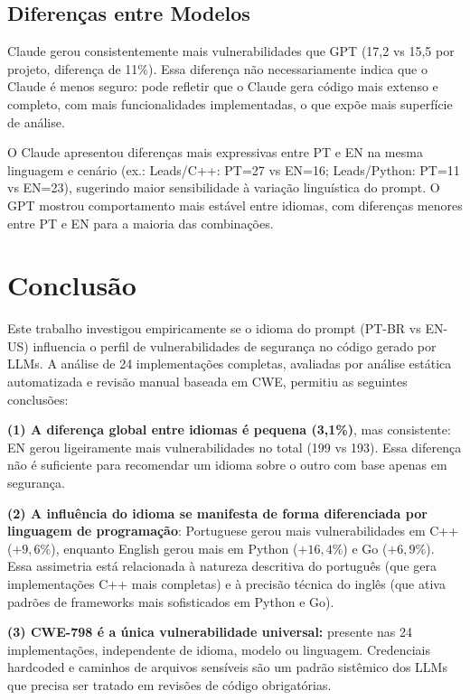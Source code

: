 \documentclass[12pt]{article}
\begin{document}
\subsection{Diferenças entre Modelos}

Claude gerou consistentemente mais vulnerabilidades que GPT (17,2 vs 15,5 por projeto, diferença de 11\%). Essa diferença não necessariamente indica que o Claude é menos seguro: pode refletir que o Claude gera código mais extenso e completo, com mais funcionalidades implementadas, o que expõe mais superfície de análise.

O Claude apresentou diferenças mais expressivas entre PT e EN na mesma linguagem e cenário (ex.: Leads/C++: PT=27 vs EN=16; Leads/Python: PT=11 vs EN=23), sugerindo maior sensibilidade à variação linguística do prompt. O GPT mostrou comportamento mais estável entre idiomas, com diferenças menores entre PT e EN para a maioria das combinações.

\section{Conclusão}
\label{sec:conclusao}

Este trabalho investigou empiricamente se o idioma do prompt (PT-BR vs EN-US) influencia o perfil de vulnerabilidades de segurança no código gerado por LLMs. A análise de 24 implementações completas, avaliadas por análise estática automatizada e revisão manual baseada em CWE, permitiu as seguintes conclusões:

\textbf{(1) A diferença global entre idiomas é pequena (3,1\%)}, mas consistente: EN gerou ligeiramente mais vulnerabilidades no total (199 vs 193). Essa diferença não é suficiente para recomendar um idioma sobre o outro com base apenas em segurança.

\textbf{(2) A influência do idioma se manifesta de forma diferenciada por linguagem de programação}: Portuguese gerou mais vulnerabilidades em C++ ($+9,6\%$), enquanto English gerou mais em Python ($+16,4\%$) e Go ($+6,9\%$). Essa assimetria está relacionada à natureza descritiva do português (que gera implementações C++ mais completas) e à precisão técnica do inglês (que ativa padrões de frameworks mais sofisticados em Python e Go).

\textbf{(3) CWE-798 é a única vulnerabilidade universal:} presente nas 24 implementações, independente de idioma, modelo ou linguagem. Credenciais hardcoded e caminhos de arquivos sensíveis são um padrão sistêmico dos LLMs que precisa ser tratado em revisões de código obrigatórias.
\end{document}

